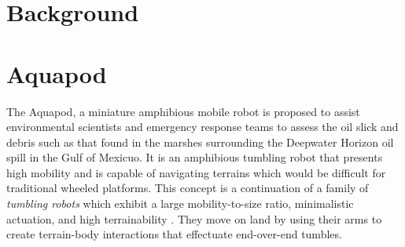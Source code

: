 \section{Background}

\section{Aquapod} %



The Aquapod, a miniature amphibious mobile robot is proposed to assist
environmental scientists and emergency response teams to assess the oil slick
and debris such as that found in the marshes surrounding the Deepwater Horizon
oil spill in the Gulf of Mexicuo. It is an amphibious tumbling robot that presents
high mobility and is capable of navigating terrains which would be difficult
for traditional wheeled platforms. This concept is a continuation of a family
of \emph{tumbling robots} which exhibit a large mobility-to-size ratio, minimalistic
actuation, and high terrainability \cite{Hemes2011, Carlson2011b}. They move on
land by using their arms to create terrain-body interactions that effectuate
end-over-end tumbles.

